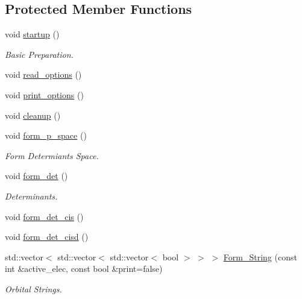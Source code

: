 \subsection*{Protected Member Functions}
\begin{DoxyCompactItemize}
\item 
void \mbox{\hyperlink{classforte_1_1_f_c_i___m_o_a644233b83d526776645fc8fec5164ff2}{startup}} ()
\begin{DoxyCompactList}\small\item\em Basic Preparation. \end{DoxyCompactList}\item 
void \mbox{\hyperlink{classforte_1_1_f_c_i___m_o_a9318660ce1439ebdbce55d7b0b97dd15}{read\+\_\+options}} ()
\item 
void \mbox{\hyperlink{classforte_1_1_f_c_i___m_o_a1f2bcf2ea19611c93bb6a99eeaab5e51}{print\+\_\+options}} ()
\item 
void \mbox{\hyperlink{classforte_1_1_f_c_i___m_o_a464c46abc824ba31a3a363305c97d8fa}{cleanup}} ()
\item 
void \mbox{\hyperlink{classforte_1_1_f_c_i___m_o_afdde49f9daf9fa1d21aacf03063b7a17}{form\+\_\+p\+\_\+space}} ()
\begin{DoxyCompactList}\small\item\em Form Determiants Space. \end{DoxyCompactList}\item 
void \mbox{\hyperlink{classforte_1_1_f_c_i___m_o_a1bb74685ed35eaba795ffdc1c5ab3762}{form\+\_\+det}} ()
\begin{DoxyCompactList}\small\item\em Determinants. \end{DoxyCompactList}\item 
void \mbox{\hyperlink{classforte_1_1_f_c_i___m_o_a16e85a3a17779937d63e39ebf186599a}{form\+\_\+det\+\_\+cis}} ()
\item 
void \mbox{\hyperlink{classforte_1_1_f_c_i___m_o_ab703a06fcd0bc51d2f9f3ef4488486dd}{form\+\_\+det\+\_\+cisd}} ()
\item 
std\+::vector$<$ std\+::vector$<$ std\+::vector$<$ bool $>$ $>$ $>$ \mbox{\hyperlink{classforte_1_1_f_c_i___m_o_a5197b52c135488f77b74ab9e656ff0f2}{Form\+\_\+\+String}} (const int \&active\+\_\+elec, const bool \&print=false)
\begin{DoxyCompactList}\small\item\em Orbital Strings. \end{DoxyCompactList}\item 

\end{DoxyCompactItemize}
